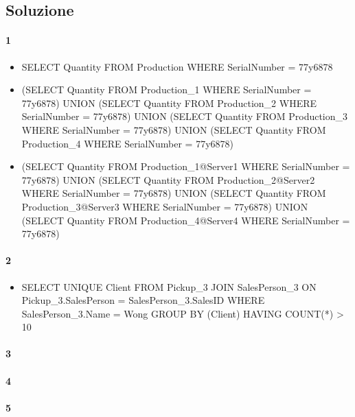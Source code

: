 \subsection{Soluzione}

\paragraph{1}

\begin{itemize}
  \item SELECT Quantity FROM Production WHERE SerialNumber = 77y6878
  \item (SELECT Quantity FROM Production\_1 WHERE SerialNumber = 77y6878) UNION (SELECT Quantity FROM Production\_2 WHERE SerialNumber = 77y6878) UNION (SELECT Quantity FROM Production\_3 WHERE SerialNumber = 77y6878) UNION (SELECT Quantity FROM Production\_4 WHERE SerialNumber = 77y6878)
  \item (SELECT Quantity FROM Production\_1@Server1 WHERE SerialNumber = 77y6878) UNION (SELECT Quantity FROM Production\_2@Server2 WHERE SerialNumber = 77y6878) UNION (SELECT Quantity FROM Production\_3@Server3 WHERE SerialNumber = 77y6878) UNION (SELECT Quantity FROM Production\_4@Server4 WHERE SerialNumber = 77y6878)
\end{itemize}

\paragraph{2}
\begin{itemize}
  \item SELECT UNIQUE Client FROM Pickup\_3 JOIN SalesPerson\_3 ON Pickup\_3.SalesPerson = SalesPerson\_3.SalesID WHERE SalesPerson\_3.Name = Wong GROUP BY (Client) HAVING COUNT(*) > 10
\end{itemize}

\paragraph{3}

\paragraph{4}

\paragraph{5}
